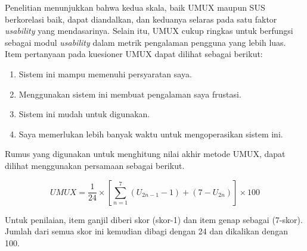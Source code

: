 \par Penelitian \citep{finstad2010usability} menunjukkan bahwa kedua skala, baik UMUX maupun SUS berkorelasi baik, dapat diandalkan, dan keduanya selaras pada satu faktor \textit{usability} yang mendasarinya. Selain itu, UMUX cukup ringkas untuk berfungsi sebagai modul \textit{usability} dalam metrik pengalaman pengguna yang lebih luas. Item pertanyaan pada kuesioner UMUX dapat dilihat sebagai berikut:

\begin{enumerate}
	\item Sistem ini mampu memenuhi persyaratan saya.
	\item Menggunakan sistem ini membuat pengalaman saya frustasi.
	\item Sistem ini mudah untuk digunakan.
	\item Saya memerlukan lebih banyak waktu untuk mengoperasikan sistem ini.
\end{enumerate}

Rumus yang digunakan untuk menghitung nilai akhir metode UMUX, dapat dilihat menggunakan persamaan sebagai berikut.

\begin{equation}
	UMUX = \frac{1}{24} \times \left [ \sum_{n=1}^{7}\left ( U_{2n-1}-1 \right ) + \left ( 7-U_{2n} \right )\right ]\times 100
\end{equation}

Untuk penilaian, item ganjil diberi skor (skor-1) dan item genap sebagai (7-skor). Jumlah dari semua skor ini kemudian dibagi dengan 24 dan dikalikan dengan 100.



\fancyhf{} 
\fancyfoot[R]{\thepage}

